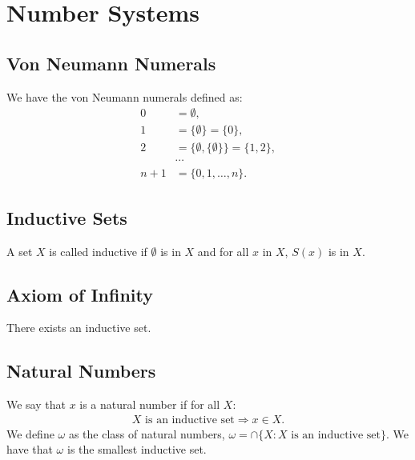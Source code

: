 \section{Number Systems}

\subsection{Von Neumann Numerals}

We have the von Neumann numerals defined as: \begin{align*}
    0 &= \emptyset, \\
    1 &= \{\emptyset\} = \{0\}, \\
    2 &= \{\emptyset, \{\emptyset\}\} = \{1, 2\}, \\
    & \cdots \\
    n + 1 &= \{0, 1, \ldots, n\}.
\end{align*}

\subsection{Inductive Sets}

A set $X$ is called inductive if $\emptyset$ is in $X$ and
for all $x$ in $X$, $S(x)$ is in $X$.

\subsection{Axiom of Infinity}

There exists an inductive set.

\subsection{Natural Numbers}

We say that $x$ is a natural number if for all $X$: \begin{align*}
    X \text{ is an inductive set} \Rightarrow x \in X.
\end{align*} We define $\omega$ as the class of natural numbers,
$\omega = \cap\{X : X \text{ is an inductive set}\}$. We have that
$\omega$ is the smallest inductive set.

